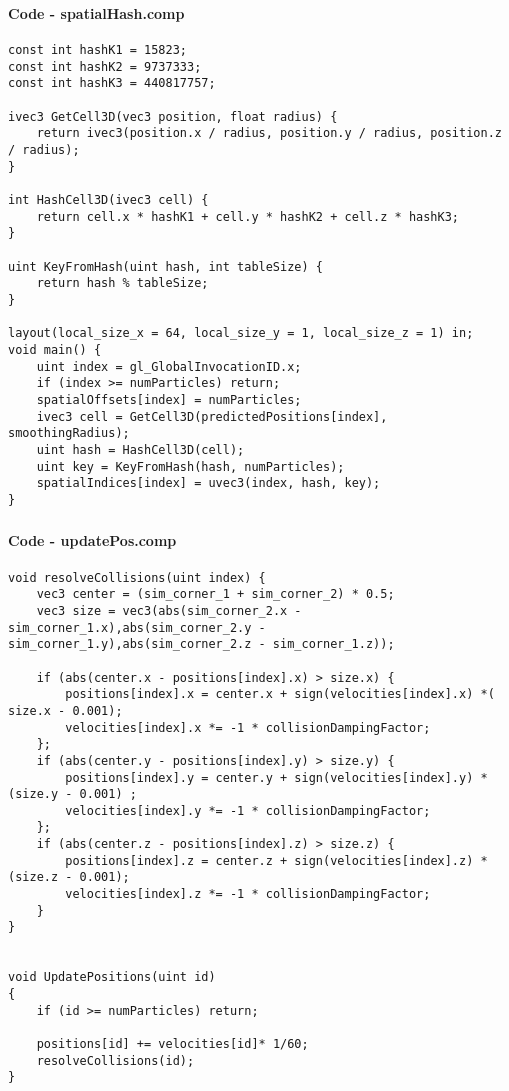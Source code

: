 \begin{frame}[fragile]
    \frametitle{\anxpti}
    \framesubtitle{Code - spatialHash.comp}

    \begin{verbatim}
const int hashK1 = 15823;
const int hashK2 = 9737333;
const int hashK3 = 440817757;

ivec3 GetCell3D(vec3 position, float radius) {
    return ivec3(position.x / radius, position.y / radius, position.z / radius);
}

int HashCell3D(ivec3 cell) {
    return cell.x * hashK1 + cell.y * hashK2 + cell.z * hashK3;
}

uint KeyFromHash(uint hash, int tableSize) {
    return hash % tableSize;
}

layout(local_size_x = 64, local_size_y = 1, local_size_z = 1) in;
void main() {
    uint index = gl_GlobalInvocationID.x;
    if (index >= numParticles) return;
    spatialOffsets[index] = numParticles;
    ivec3 cell = GetCell3D(predictedPositions[index], smoothingRadius);
    uint hash = HashCell3D(cell);
    uint key = KeyFromHash(hash, numParticles);
    spatialIndices[index] = uvec3(index, hash, key);
}
    \end{verbatim}
\end{frame}


\begin{frame}[fragile]
    \frametitle{\anxpti}
    \framesubtitle{Code - updatePos.comp}

    \begin{verbatim}
void resolveCollisions(uint index) {
    vec3 center = (sim_corner_1 + sim_corner_2) * 0.5;
    vec3 size = vec3(abs(sim_corner_2.x - sim_corner_1.x),abs(sim_corner_2.y - sim_corner_1.y),abs(sim_corner_2.z - sim_corner_1.z));

    if (abs(center.x - positions[index].x) > size.x) {
        positions[index].x = center.x + sign(velocities[index].x) *( size.x - 0.001);
        velocities[index].x *= -1 * collisionDampingFactor;
    };
    if (abs(center.y - positions[index].y) > size.y) {
        positions[index].y = center.y + sign(velocities[index].y) *(size.y - 0.001) ;
        velocities[index].y *= -1 * collisionDampingFactor;
    };
    if (abs(center.z - positions[index].z) > size.z) {
        positions[index].z = center.z + sign(velocities[index].z) *(size.z - 0.001);
        velocities[index].z *= -1 * collisionDampingFactor;
    }
}


void UpdatePositions(uint id)
{
    if (id >= numParticles) return;

    positions[id] += velocities[id]* 1/60;
    resolveCollisions(id);
}
    \end{verbatim}
\end{frame}



